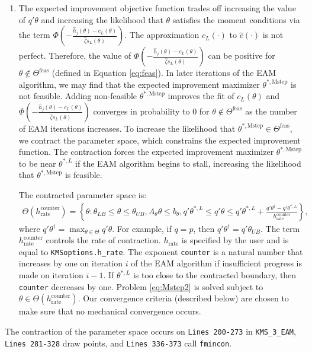 \documentclass[12pt]{article}
\def\code#1{\texttt{#1}}
\begin{document}
\begin{enumerate}
\item The expected improvement objective function trades off increasing the value of $q'\theta$ and increasing the likelihood that $\theta$ satisfies the moment conditions via the term $\Phi \left(- \frac{  \hat h_j(\theta) - c_L(\theta)}{\hat \zeta s_L(\theta)} \right)$. The approximation $c_L(\cdot)$ to $\hat c(\cdot)$ is not perfect.  Therefore, the value of $\Phi \left(- \frac{  \hat h_j(\theta) - c_L(\theta)}{\hat \zeta s_L(\theta)} \right)$ can be positive for $\theta \not \in \Theta^{\text{feas}}$ (defined in Equation \eqref{eq:feas}).  In later iterations of the EAM algorithm, we may find that the expected improvement maximizer $\theta^{*,\text{Mstep}}$ is not feasible.  Adding non-feasible $\theta^{*,\text{Mstep}}$ improves the fit of $c_L(\theta)$ and $\Phi \left(- \frac{  \hat h_j(\theta) - c_L(\theta)}{\hat \zeta s_L(\theta)} \right)$ converges in probability to $0$ for $\theta \not \in \Theta^{\text{feas}}$ as the number of EAM iterations increases.   To increase the likelihood that $\theta^{*,\text{Mstep}} \in \Theta^{\text{feas}}$, we contract the parameter space, which constrains the expected improvement function.  The contraction forces the expected improvement maximizer $\theta^{*,\text{Mstep}}$ to be near $\theta^{*,L}$ if the EAM algorithm begins to stall, increasing the likelihood that $\theta^{*,\text{Mstep}}$ is feasible.

    The contracted parameter space is:
    \begin{align}\label{eq:contract}
    \Theta(h_{\text{rate}}^{\text{counter}}) = \left\{\theta : \theta_{LB} \leq \theta \leq \theta_{UB}, A_{\theta} \theta \leq b_{\theta},  q'\theta^{*,L}  \leq q'\theta \leq q'\theta^{*,L}  + \frac{ q'\theta^{\dagger}- q'\theta^{*,L}}{h_{\text{rate}}^{\text{counter}}}\right\},
    \end{align}
     where $q'\theta^{\dagger} = \max_{\theta \in \Theta} q'\theta$.  For example, if $q=p$, then  $q'\theta^{\dagger} = q' \theta_{UB}$.  The term $h_{\text{rate}}^{\text{counter}}$ controls the rate of contraction.  $h_{\text{rate}}$ is specified by the user and is equal to \code{KMSoptions.h\_rate}.  The exponent \code{counter} is a natural number that increases by one on iteration $i$ of the EAM algorithm if insufficient progress is made on iteration $i-1$.  If $\theta^{*,L}$ is too close to the contracted boundary, then \code{counter} decreases by one.  Problem \eqref{eq:Mstep2} is solved subject to $\theta \in \Theta(h_{\text{rate}}^{\text{counter}})$.  Our convergence criteria (described below) are chosen to make sure that no mechanical convergence occurs.
\end{enumerate}
The contraction of the parameter space occurs on \code{Lines 200-273} in \code{KMS\_3\_EAM},  \code{Lines 281-328} draw points, and \code{Lines 336-373} call \code{fmincon}.
\end{document}
